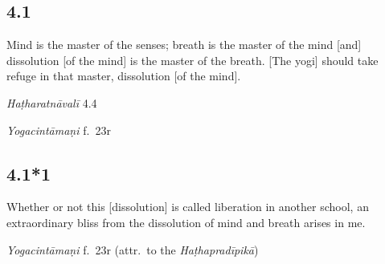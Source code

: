 \begin{ekdosis}
\subsection*{4.1}
\begin{translation}[hp04_001]
Mind is the master of the senses; breath is the master of the mind [and] dissolution [of the mind] is the master of the breath. [The yogi] should take refuge in that master, dissolution [of the mind].
\end{translation}
%


\begin{testimonia}[hp04_001]
\emph{Haṭharatnāvalī} 4.4
\begin{versinnote}
\end{versinnote}

\emph{Yogacintāmaṇi} f.~23r
\begin{versinnote}
\end{versinnote}

\end{testimonia}

%

\subsection*{4.1*1}
\begin{translation}[hp04_001_1]
Whether or not this [dissolution] is called liberation in another school, an extraordinary bliss from the dissolution of mind and breath arises in me.
\end{translation}

\begin{testimonia}[hp04_001_1]
\emph{Yogacintāmaṇi} f.~23r (attr.~to the \emph{Haṭhapradīpikā})
\begin{versinnote}
\end{versinnote}
\end{testimonia}


\end{ekdosis}
